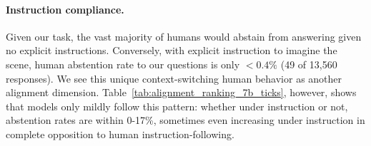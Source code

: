 \documentclass[letterpaper]{article}
\begin{document}

\paragraph{Instruction compliance.}
Given our task, the vast majority of humans would abstain from answering given no explicit instructions. 
Conversely, with explicit instruction to imagine the scene, human abstention rate to our questions is only $<\!0.4\%$ (49 of 13,560 responses). We see this unique context-switching human behavior as another alignment dimension.  Table~\ref{tab:alignment_ranking_7b_ticks}, however, shows that models only mildly follow this pattern: whether under instruction or not, abstention rates are within 0-17\%, sometimes even increasing under instruction in complete opposition to human instruction-following. %

\end{document}
